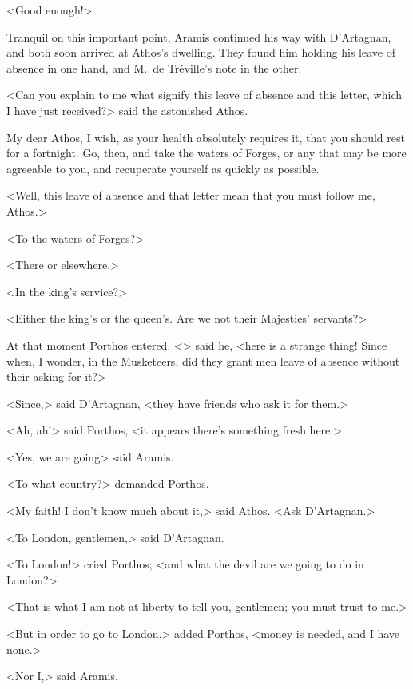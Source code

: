 <Good enough!> 

Tranquil on this important point, Aramis continued his way with D'Artagnan, and both soon arrived at Athos's dwelling. They found him holding his leave of absence in one hand, and M.~de Tréville's note in the other. 

<Can you explain to me what signify this leave of absence and this letter, which I have just received?> said the astonished Athos. 

\begin{mail}{}{My dear Athos,}
I wish, as your health absolutely requires it, that you should rest for a fortnight. Go, then, and take the waters of Forges, or any that may be more agreeable to you, and recuperate yourself as quickly as possible. 

\end{mail}

<Well, this leave of absence and that letter mean that you must follow me, Athos.> 

<To the waters of Forges?> 

<There or elsewhere.> 

<In the king's service?> 

<Either the king's or the queen's. Are we not their Majesties' servants?> 

At that moment Porthos entered. <> said he, <here is a strange thing! Since when, I wonder, in the Musketeers, did they grant men leave of absence without their asking for it?> 

<Since,> said D'Artagnan, <they have friends who ask it for them.> 

<Ah, ah!> said Porthos, <it appears there's something fresh here.> 

<Yes, we are going\longdash> said Aramis. 

<To what country?> demanded Porthos. 

<My faith! I don't know much about it,> said Athos. <Ask D'Artagnan.> 

<To London, gentlemen,> said D'Artagnan. 

<To London!> cried Porthos; <and what the devil are we going to do in London?> 

<That is what I am not at liberty to tell you, gentlemen; you must trust to me.> 

<But in order to go to London,> added Porthos, <money is needed, and I have none.> 

<Nor I,> said Aramis. 

